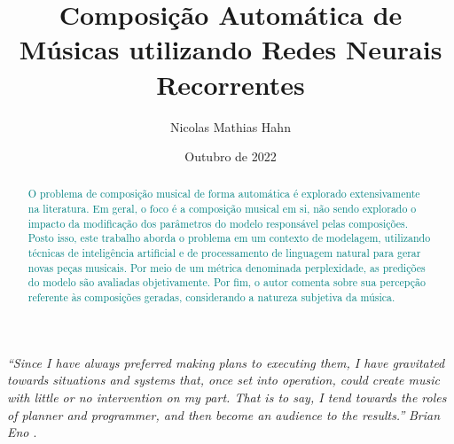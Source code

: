 \documentclass{automatextcc}
\newcommand{\nico}[1]{\textcolor{teal}{#1}}
\begin{document}
\title{Composição Automática de Músicas utilizando Redes Neurais Recorrentes}
\author{Nicolas Mathias Hahn}



\dept{\DEST}

\date{Outubro de 2022}


\maketitulo

\makefolhaderosto

\makefolhadeaprovacaoA %


\newpage
\vspace*{\fill}
\begin{flushright} %
	\textit{``Since I have always preferred making plans to executing them, I have gravitated towards situations and systems that, once set into operation, could create music with little or no intervention on my part. That is to say, I tend towards the roles of planner and programmer, and then become an audience to the results.''} \newline
	\textit{Brian Eno \citep{alpern1995}}.
\end{flushright}




\begin{abstract}
\nico{
O problema de composição musical de forma automática é explorado extensivamente na literatura. Em geral, o foco é a composição musical em si, não sendo explorado o impacto da modificação dos parâmetros do modelo responsável pelas composições. Posto isso, este trabalho aborda o problema em um contexto de modelagem, utilizando técnicas de inteligência artificial e de processamento de linguagem natural para gerar novas peças musicais. Por meio de um métrica denominada perplexidade, as predições do modelo são avaliadas objetivamente. Por fim, o autor comenta sobre sua percepção referente às composições geradas, considerando a natureza subjetiva da música.
}
\end{abstract}
\end{document}
